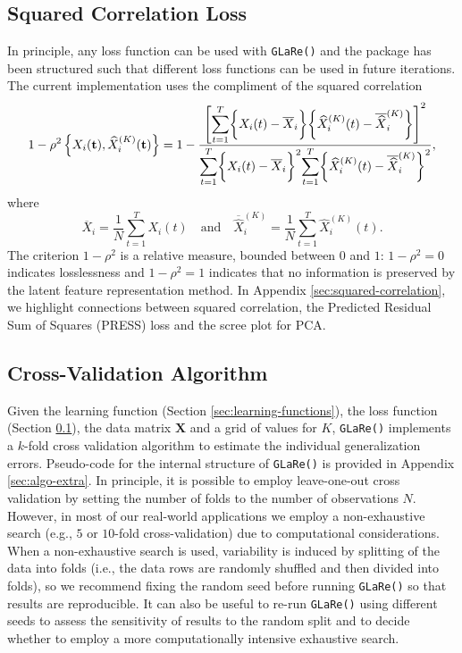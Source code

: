 \subsection{Squared Correlation Loss}\label{sec:loss-functions}

In principle, any loss function can be used with \texttt{GLaRe()} and the package has been structured such that different loss functions can be used in future iterations.
The current implementation uses the compliment of the squared correlation
$$
1- \rho^2 \left\{X_i (\mathbf{t}), \widehat{X}^{(K)}_{i} (\mathbf{t}) \right\} =
1 - \frac{\left[ \mathlarger{\sum}_{t = 1}^T{\bigg\{X_i (t) - \overline{X}_i \bigg\} \bigg\{ \widehat{X}_i^{(K)} (t) - \overline{\widehat{X}}_i^{(K)} \bigg\}} \right]^2}{\mathlarger{\sum}_{t = 1}^T \bigg\{X_i (t) - \overline{X}_i \bigg\}^2 \mathlarger{\sum}_{t = 1}^T \bigg\{ \widehat{X}_i^{(K)} (t) - \overline{\widehat{X}}_i^{(K)} \bigg\} ^2},
$$
where
$$
\overline{X}_i = \frac{1}{N} \sum_{t=1}^T X_i (t) \quad \text{and} \quad \overline{\widehat{X}}_i^{(K)} = \frac{1}{N} \sum_{t=1}^T \widehat{X}_i^{(K)} (t).
$$
The criterion $1- \rho^2$ is a relative measure, bounded between $0$ and $1$: $1- \rho^2 = 0$ indicates losslessness and $1- \rho^2 = 1$ indicates that no information is preserved by the latent feature representation method.
In Appendix \ref{sec:squared-correlation}, we highlight connections between squared correlation, the Predicted Residual Sum of Squares (PRESS) loss and the scree plot for PCA.

\subsection{Cross-Validation Algorithm}

Given the learning function (Section \ref{sec:learning-functions}), the loss function (Section \ref{sec:loss-functions}), the data matrix $\mathbf{X}$ and a grid of values for $K$, \texttt{GLaRe()} implements a $k$-fold cross validation algorithm to estimate the individual generalization errors.
Pseudo-code for the internal structure of \texttt{GLaRe()} is provided in Appendix \ref{sec:algo-extra}.
In principle, it is possible to employ leave-one-out cross validation by setting the number of folds to the number of observations $N$.
However, in most of our real-world applications we employ a non-exhaustive search (e.g., $5$ or $10$-fold cross-validation) due to computational considerations.
When a non-exhaustive search is used, variability is induced by splitting of the data into folds (i.e., the data rows are randomly shuffled and then divided into folds), so we recommend fixing the random seed before running \texttt{GLaRe()} so that results are reproducible.
It can also be useful to re-run \texttt{GLaRe()} using different seeds to assess the sensitivity of results to the random split and to decide whether to employ a more computationally intensive exhaustive search.

